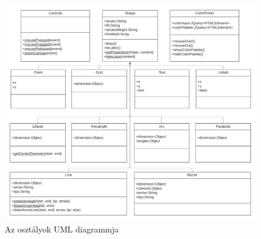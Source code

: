 

\begin{figure}[!h]
	\includegraphics[width=\textwidth]{images/uml.png}
	\caption{Az osztályok UML diagrammja}
	\label{fig:uml1}
\end{figure}


